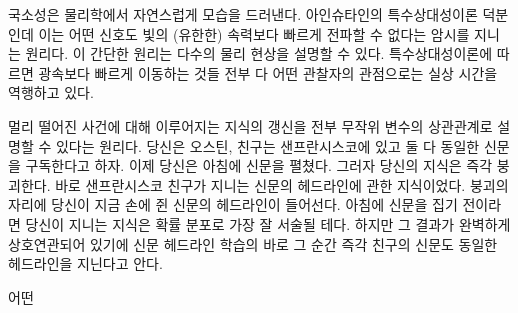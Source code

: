 \documentclass[a4paper,chapter,kosection,atbegshi,hidelinks,itemph]{oblivoir}
\begin{document}
\hfill

국소성은 물리학에서 자연스럽게 모습을 드러낸다. 아인슈타인의 특수상대성이론
덕분인데 이는 어떤 신호도 빛의 (유한한) 속력보다 빠르게 전파할 수 없다는
암시를 지니는 원리다. 이 간단한 원리는 다수의 물리 현상을 설명할 수 있다. 
특수상대성이론에 따르면 광속보다 빠르게 이동하는 것들 전부 다 어떤 관찰자의 
관점으로는 실상 시간을 역행하고 있다.\break

\begin{description}[leftmargin=0cm]
    \item[국소적 실재론{\footnotesize Local Realism}] 멀리 떨어진 사건에 대해 
        이루어지는 지식의 갱신을 전부 무작위 변수의 상관관계로 설명할 수 있다는
        원리다. 당신은 오스틴, 친구는 샌프란시스코에 있고 둘 다 동일한 신문을
        구독한다고 하자. 이제 당신은 아침에 신문을 펼쳤다. 그러자 당신의 지식은
        즉각 붕괴한다. 바로 샌프란시스코 친구가 지니는 신문의 헤드라인에 관한
        지식이었다. 붕괴의 자리에 당신이 지금 손에 쥔 신문의 헤드라인이 들어선다.
        아침에 신문을 집기 전이라면 당신이 지니는 지식은 확률 분포로 가장 잘
        서술될 테다. 하지만 그 결과가 완벽하게 상호연관되어 있기에 신문 헤드라인
        학습의 바로 그 순간 즉각 친구의 신문도 동일한 헤드라인을 지닌다고 안다.
        \end{description}

\newpage
\hfill\parbox[t]{9cm}{어떤 }
\end{document}
